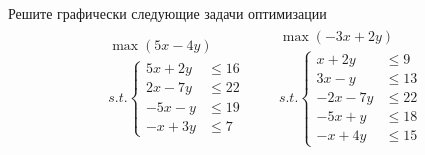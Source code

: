 \begin{exercise}
Решите графически следующие задачи оптимизации
\begin{align*}
	& \begin{gathered}
		\max(5x-4y) \\
		s.t.\left\{\begin{aligned}
			5x+2y &\leqslant 16 \\ 2x-7y &\leqslant 22 \\ 
			-5x-y &\leqslant 19 \\ -x+3y &\leqslant 7
		\end{aligned}\right.
	\end{gathered} &
	& \begin{gathered}
		\max(-3x+2y) \\
		s.t.\left\{\begin{aligned}
			x+2y &\leqslant 9 \\ 3x-y &\leqslant 13 \\ 
			-2x-7y &\leqslant 22 \\ -5x+y &\leqslant 18 \\ 
			-x+4y &\leqslant 15
		\end{aligned}\right.
	\end{gathered} 
\end{align*}
\end{exercise}



